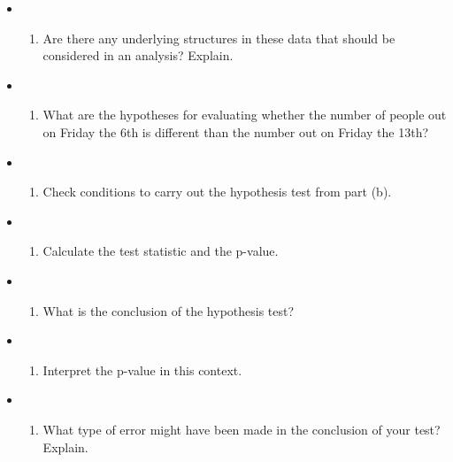 \documentclass[]{book}
\providecommand{\tightlist}{%
  \setlength{\itemsep}{0pt}\setlength{\parskip}{0pt}}
\begin{document}
\begin{itemize}
\item
  \begin{enumerate}
  \def\labelenumi{(\alph{enumi})}
  \tightlist
  \item
    Are there any underlying structures in these data that should be considered in an analysis? Explain.
  \end{enumerate}
\item
  \begin{enumerate}
  \def\labelenumi{(\alph{enumi})}
  \setcounter{enumi}{1}
  \tightlist
  \item
    What are the hypotheses for evaluating whether the number of people out on Friday the 6th is different than the number out on Friday the 13th?
  \end{enumerate}
\item
  \begin{enumerate}
  \def\labelenumi{(\alph{enumi})}
  \setcounter{enumi}{2}
  \tightlist
  \item
    Check conditions to carry out the hypothesis test from part (b).
  \end{enumerate}
\item
  \begin{enumerate}
  \def\labelenumi{(\alph{enumi})}
  \setcounter{enumi}{3}
  \tightlist
  \item
    Calculate the test statistic and the p-value.
  \end{enumerate}
\item
  \begin{enumerate}
  \def\labelenumi{(\alph{enumi})}
  \setcounter{enumi}{4}
  \tightlist
  \item
    What is the conclusion of the hypothesis test?
  \end{enumerate}
\item
  \begin{enumerate}
  \def\labelenumi{(\alph{enumi})}
  \setcounter{enumi}{5}
  \tightlist
  \item
    Interpret the p-value in this context.
  \end{enumerate}
\item
  \begin{enumerate}
  \def\labelenumi{(\alph{enumi})}
  \setcounter{enumi}{6}
  \tightlist
  \item
    What type of error might have been made in the conclusion of your test? Explain.
  \end{enumerate}
\end{itemize}
\end{document}
